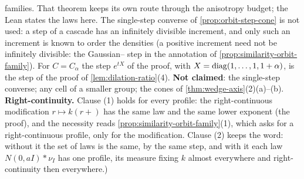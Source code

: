 \begin{proposition}
{families. That theorem keeps its own route through the anisotropy budget; the Lean states the laws here. The
single-step converse of \ref{prop:orbit-step-cone} is not used: a step of a cascade has an infinitely
divisible increment, and only such an increment is known to order the densities (a positive increment
need not be infinitely divisible: the Gaussian--\Matern{} step in the annotation of
\ref{prop:similarity-orbit-family}). For $C = C_\alpha$ the step $e^{tX}$ of the proof, with
$X = \operatorname{diag}(1, \dots, 1, 1 + \alpha)$, is the step of the proof of \ref{lem:dilation-ratio}(4).
\textbf{Not claimed}: the single-step converse; any cell of a smaller group; the cones of
\ref{thm:wedge-axis}(2)(a)--(b).
\textbf{Right-continuity.} Clause (1) holds for every profile: the right-continuous modification
$r \mapsto k(r{+})$ has the same law and the same lower exponent (the proof), and the necessity reads
\ref{prop:similarity-orbit-family}(1), which asks for a right-continuous profile, only for the modification.
Clause (2) keeps the word: without it the set of laws is the same, by the same step, and with it each law
$N(0, aI) * \nu_I$ has one profile, its \Levy{} measure fixing $k$ almost everywhere and right-continuity
then everywhere.)}
\end{proposition}

